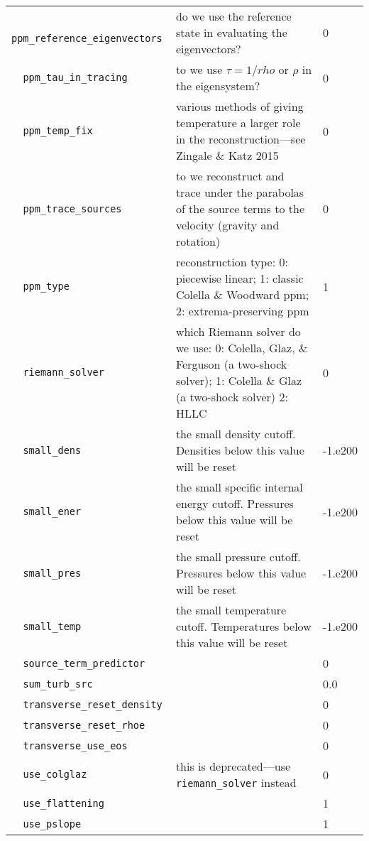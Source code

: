 \begin{landscape}
{\begin{center}
\begin{longtable}{|l|p{5.25in}|l|}
\verb=  ppm_reference_eigenvectors  = &   do we use the reference state in evaluating the eigenvectors?  &  0 \\
\rowcolor{tableShade}
\verb=  ppm_tau_in_tracing  = &   to we use $\tau = 1/rho$ or $\rho$ in the eigensystem?  &  0 \\
\verb=  ppm_temp_fix  = &   various methods of giving temperature a larger role in the reconstruction---see Zingale \& Katz 2015  &  0 \\
\rowcolor{tableShade}
\verb=  ppm_trace_sources  = &   to we reconstruct and trace under the parabolas of the source terms to the velocity (gravity and rotation)  &  0 \\
\verb=  ppm_type  = &   reconstruction type: 0: piecewise linear; 1: classic Colella \& Woodward ppm; 2: extrema-preserving ppm  &  1 \\
\rowcolor{tableShade}
\verb=  riemann_solver  = &   which Riemann solver do we use: 0: Colella, Glaz, \& Ferguson (a two-shock solver); 1: Colella \& Glaz (a two-shock solver) 2: HLLC  &  0 \\
\verb=  small_dens  = &   the small density cutoff.  Densities below this value will be reset  &  -1.e200 \\
\rowcolor{tableShade}
\verb=  small_ener  = &   the small specific internal energy cutoff.  Pressures below this value will be reset  &  -1.e200 \\
\verb=  small_pres  = &   the small pressure cutoff.  Pressures below this value will be reset  &  -1.e200 \\
\rowcolor{tableShade}
\verb=  small_temp  = &   the small temperature cutoff.  Temperatures below this value will be reset  &  -1.e200 \\
\verb=  source_term_predictor  = &    &  0 \\
\rowcolor{tableShade}
\verb=  sum_turb_src  = &    &  0.0 \\
\verb=  transverse_reset_density  = &    &  0 \\
\rowcolor{tableShade}
\verb=  transverse_reset_rhoe  = &    &  0 \\
\verb=  transverse_use_eos  = &    &  0 \\
\rowcolor{tableShade}
\verb=  use_colglaz  = &   this is deprecated---use {\tt riemann\_solver} instead  &  0 \\
\verb=  use_flattening  = &    &  1 \\
\rowcolor{tableShade}
\verb=  use_pslope  = &    &  1 \\



\end{longtable}
\end{center}}
\end{landscape}
